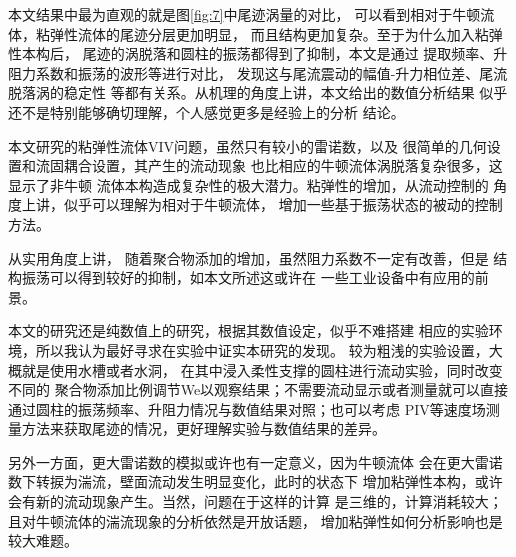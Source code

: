 \documentclass[UTF8,zihao=5]{ctexart} %
\begin{document}
本文结果中最为直观的就是图\ref{fig:7}中尾迹涡量的对比，
可以看到相对于牛顿流体，粘弹性流体的尾迹分层更加明显，
而且结构更加复杂。至于为什么加入粘弹性本构后，
尾迹的涡脱落和圆柱的振荡都得到了抑制，本文是通过
提取频率、升阻力系数和振荡的波形等进行对比，
发现这与尾流震动的幅值-升力相位差、尾流脱落涡的稳定性
等都有关系。从机理的角度上讲，本文给出的数值分析结果
似乎还不是特别能够确切理解，个人感觉更多是经验上的分析
结论。

本文研究的粘弹性流体VIV问题，虽然只有较小的雷诺数，以及
很简单的几何设置和流固耦合设置，其产生的流动现象
也比相应的牛顿流体涡脱落复杂很多，这显示了非牛顿
流体本构造成复杂性的极大潜力。粘弹性的增加，从流动控制的
角度上讲，似乎可以理解为相对于牛顿流体，
增加一些基于振荡状态的被动的控制方法。

从实用角度上讲，
随着聚合物添加的增加，虽然阻力系数不一定有改善，但是
结构振荡可以得到较好的抑制，如本文所述这或许在
一些工业设备中有应用的前景。

本文的研究还是纯数值上的研究，根据其数值设定，似乎不难搭建
相应的实验环境，所以我认为最好寻求在实验中证实本研究的发现。
较为粗浅的实验设置，大概就是使用水槽或者水洞，
在其中浸入柔性支撑的圆柱进行流动实验，同时改变不同的
聚合物添加比例调节We以观察结果；不需要流动显示或者测量就可以直接
通过圆柱的振荡频率、升阻力情况与数值结果对照；也可以考虑
PIV等速度场测量方法来获取尾迹的情况，更好理解实验与数值结果的差异。

另外一方面，更大雷诺数的模拟或许也有一定意义，因为牛顿流体
会在更大雷诺数下转捩为湍流，壁面流动发生明显变化，此时的状态下
增加粘弹性本构，或许会有新的流动现象产生。当然，问题在于这样的计算
是三维的，计算消耗较大；且对牛顿流体的湍流现象的分析依然是开放话题，
增加粘弹性如何分析影响也是较大难题。


{}

































\end{document}

